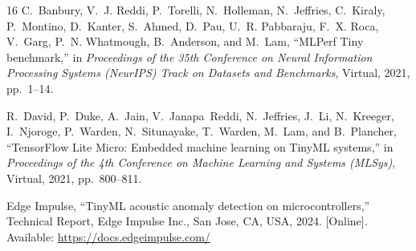 \documentclass[conference]{IEEEtran}
\begin{document}
\begin{thebibliography}{16}
C.~Banbury, V.~J. Reddi, P.~Torelli, N.~Holleman, N.~Jeffries, C.~Kiraly, P.~Montino, D.~Kanter, S.~Ahmed, D.~Pau, U.~R. Pabbaraju, F.~X. Roca, V.~Garg, P.~N. Whatmough, B.~Anderson, and M.~Lam, ``MLPerf Tiny benchmark,'' in \emph{Proceedings of the 35th Conference on Neural Information Processing Systems (NeurIPS) Track on Datasets and Benchmarks}, Virtual, 2021, pp.~1--14.

R.~David, P.~Duke, A.~Jain, V.~Janapa~Reddi, N.~Jeffries, J.~Li, N.~Kreeger, I.~Njoroge, P.~Warden, N.~Situnayake, T.~Warden, M.~Lam, and B.~Plancher, ``TensorFlow Lite Micro: Embedded machine learning on TinyML systems,'' in \emph{Proceedings of the 4th Conference on Machine Learning and Systems (MLSys)}, Virtual, 2021, pp.~800--811.

Edge Impulse, ``TinyML acoustic anomaly detection on microcontrollers,'' Technical Report, Edge Impulse Inc., San Jose, CA, USA, 2024. [Online]. Available: \url{https://docs.edgeimpulse.com/}

\end{thebibliography}
\end{document}
